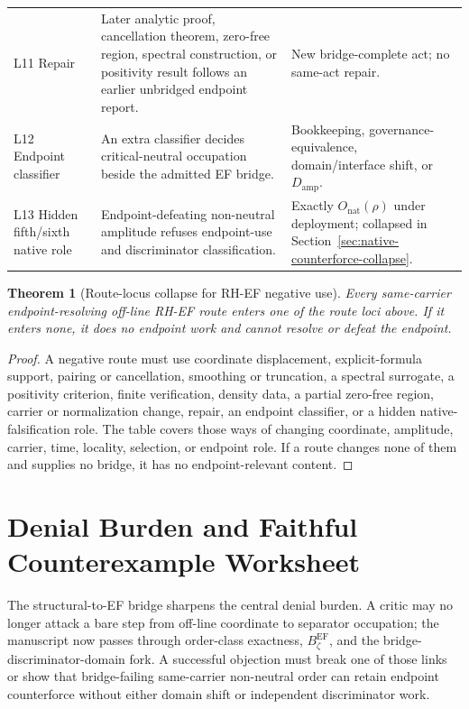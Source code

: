 \documentclass[11pt]{article}
\newtheorem{theorem}{Theorem}[section]
\newcommand{\Damp}{D_{\mathrm{amp}}}
\newcommand{\BzetaEF}{B^{\mathrm{EF}}_{\zeta}}
\newcommand{\Onat}{O_{\mathrm{nat}}}
\begin{document}
\begin{longtable}{L{0.18\textwidth}L{0.50\textwidth}L{0.23\textwidth}}
L11 Repair & Later analytic proof, cancellation theorem, zero-free region, spectral construction, or positivity result follows an earlier unbridged endpoint report. & New bridge-complete act; no same-act repair.\\
L12 Endpoint classifier & An extra classifier decides critical-neutral occupation beside the admitted EF bridge. & Bookkeeping, governance-equivalence, domain/interface shift, or \(\Damp\).\\
L13 Hidden fifth/sixth native role & Endpoint-defeating non-neutral amplitude refuses endpoint-use and discriminator classification. & Exactly \(\Onat(\rho)\) under deployment; collapsed in Section~\ref{sec:native-counterforce-collapse}.\\
\bottomrule
\end{longtable}

\begin{theorem}[Route-locus collapse for RH-EF negative use]
Every same-carrier endpoint-resolving off-line RH-EF route enters one of the route loci above.  If it enters none, it does no endpoint work and cannot resolve or defeat the endpoint.
\end{theorem}

\begin{proof}
A negative route must use coordinate displacement, explicit-formula support, pairing or cancellation, smoothing or truncation, a spectral surrogate, a positivity criterion, finite verification, density data, a partial zero-free region, carrier or normalization change, repair, an endpoint classifier, or a hidden native-falsification role.  The table covers those ways of changing coordinate, amplitude, carrier, time, locality, selection, or endpoint role.  If a route changes none of them and supplies no bridge, it has no endpoint-relevant content.
\end{proof}
\section{Denial Burden and Faithful Counterexample Worksheet}

The structural-to-EF bridge sharpens the central denial burden.  A critic may no longer attack a bare step from off-line coordinate to separator occupation; the manuscript now passes through order-class exactness, \(\BzetaEF\), and the bridge-discriminator-domain fork.  A successful objection must break one of those links or show that bridge-failing same-carrier non-neutral order can retain endpoint counterforce without either domain shift or independent discriminator work.
\end{document}
